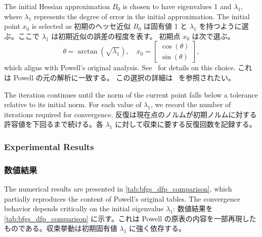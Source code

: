 \documentclass[0_main]{subfiles}
\begin{document}
\ifEn
    The initial Hessian approximation $B_0$ is chosen to have eigenvalues 1 and $\lambda_1$, where $\lambda_1$ represents the degree of error in the initial approximation.
    The initial point $x_0$ is selected as
\else
    初期のヘッセ近似 $B_0$ は固有値 1 と $\lambda_1$ を持つように選ぶ。ここで $\lambda_1$ は初期近似の誤差の程度を表す。
    初期点 $x_0$ は次で選ぶ。
\fi
\begin{equation*}
    \theta = \arctan(\sqrt{\lambda_1}), \quad x_0 = \begin{bmatrix}\cos(\theta) \\ \sin(\theta)\end{bmatrix},
\end{equation*}
\ifEn
    which aligns with Powell's original analysis.
    See~\citep{powellHowBadAre1986} for details on this choice.
\else
    これは Powell の元の解析に一致する。
    この選択の詳細は~\citep{powellHowBadAre1986} を参照されたい。
\fi

\ifEn
    The iteration continues until the norm of the current point falls below a tolerance relative to its initial norm. For each value of $\lambda_1$, we record the number of iterations required for convergence.
\else
    反復は現在点のノルムが初期ノルムに対する許容値を下回るまで続ける。各 $\lambda_1$ に対して収束に要する反復回数を記録する。
\fi

\ifEn
    \subsubsection{Experimental Results}
\else
    \subsubsection{数値結果}
\fi

\ifEn
    The numerical results are presented in \cref{tab:bfgs_dfp_comparison}, which partially reproduces the content of Powell's original tables. The convergence behavior depends critically on the initial eigenvalue $\lambda_1$:
\else
    数値結果を \cref{tab:bfgs_dfp_comparison} に示す。これは Powell の原表の内容を一部再現したものである。収束挙動は初期固有値 $\lambda_1$ に強く依存する。
\fi
\end{document}
